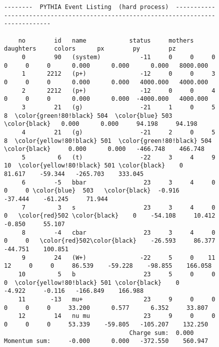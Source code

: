 \begin{figure}[h!]
\begin{center}
\begingroup
    \fontsize{6pt}{6pt}\selectfont
\begin{Verbatim}[commandchars=\\\{\},codes={\catcode`$=3\catcode`^=7\catcode`_=8}]
 --------  PYTHIA Event Listing  (hard process)  -----------------------------------------------------------------------------------
 
    no        id   name            status     mothers   daughters     colors      px        py        pz             
     0        90   (system)           -11     0     0     0     0     0     0      0.000      0.000      0.000   8000.000  
     1      2212   (p+)               -12     0     0     3     0     0     0      0.000      0.000   4000.000   4000.000     
     2      2212   (p+)               -12     0     0     4     0     0     0      0.000      0.000  -4000.000   4000.000     
     3        21   (g)                -21     1     0     5     8  \color{green!80!black} 504  \color{blue} 503   \color{black}   0.000      0.000     94.198     94.198    
     4        21   (g)                -21     2     0     5     8  \color{yellow!80!black} 501  \color{green!80!black} 504 \color{black}     0.000      0.000   -466.748    466.748     
     5         6   (t)                -22     3     4     9    10  \color{yellow!80!black} 501 \color{black}    0     81.617    -59.344   -265.703    333.045    
     6        -5   bbar                23     3     4     0     0     0 \color{blue}  503   \color{black}  -0.916    -37.444    -61.245     71.944   
     7         3   s                   23     3     4     0     0   \color{red}502 \color{black}    0    -54.108     10.412     -0.850     55.107      
     8        -4   cbar                23     3     4     0     0     0   \color{red}502\color{black}    -26.593     86.377    -44.751    100.851     
     9        24   (W+)               -22     5     0    11    12     0     0     86.539    -59.228    -98.855    166.058    
    10         5   b                   23     5     0     0     0  \color{yellow!80!black} 501 \color{black}    0     -4.922     -0.116   -166.849    166.988     
    11       -13   mu+                 23     9     0     0     0     0     0     33.200      0.577      6.352     33.807     
    12        14   nu mu               23     9     0     0     0     0     0     53.339    -59.805   -105.207    132.250      
                                   Charge sum:  0.000           Momentum sum:     -0.000      0.000   -372.550    560.947   


\end{Verbatim}
\end{center}
\end{figure}
